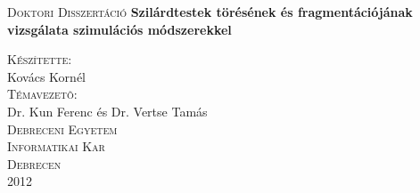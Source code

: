 \renewcommand{\baselinestretch}{1}
\thispagestyle{empty}
\begin{titlepage}
\begin{center}

\vskip 4cm

{\Huge \scshape Doktori Disszertáció}
\vskip 2cm
{\Large \bfseries  Szilárdtestek törésének és fragmentációjának vizsgálata szimulációs módszerekkel}
\vskip 5cm

{\large
\textsc{Készítette:\\}Kovács Kornél\\}
\vskip 1cm
\textsc{Témavezetõ:\\}
\vskip 1cm
{\rm\Large Dr. Kun Ferenc és Dr. Vertse Tamás \\}
\normalsize 
\vfill
\textsc{Debreceni Egyetem\\
 Informatikai Kar\\
	\vskip 5pt
Debrecen\\ 
2012}

\end{center}
\end{titlepage}
            
